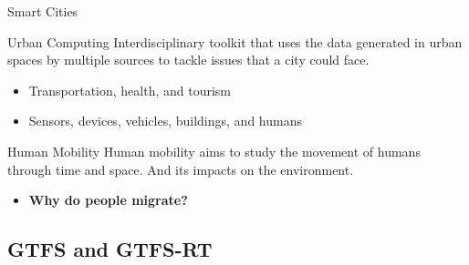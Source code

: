 \documentclass[xcolor=dvipsnames,table]{beamer}
\begin{document}
\begin{frame}{Smart Cities}
        \begin{block}{Urban Computing}
                Interdisciplinary toolkit that uses the data generated in urban spaces by multiple sources to tackle issues that a city could face.
                \begin{itemize}
                        \item Transportation, health, and tourism
                        \item Sensors, devices, vehicles, buildings, and humans
                \end{itemize}
        \end{block}
        \begin{block}{Human Mobility}
                Human mobility aims to study the movement of humans through time and space. And its
                impacts on the environment.
                \begin{itemize}
                        \item \textbf{Why do people migrate?}
                \end{itemize}
        \end{block}
\end{frame}

\subsection{GTFS and GTFS-RT}
\end{document}
